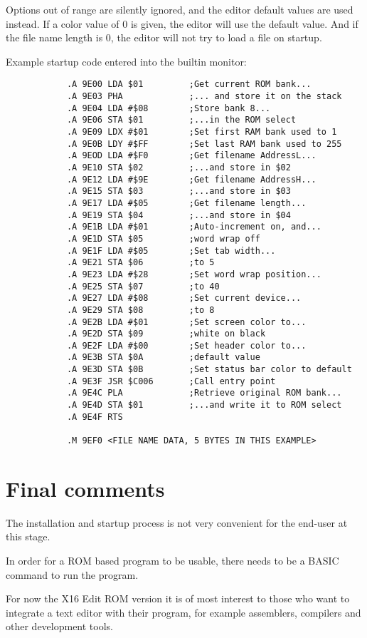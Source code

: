 \documentclass{article}
\begin{document}
        \vspace{1em}Options out of range are silently ignored, and the editor default values are used instead. If a color value of 0 is given, the
        editor will use the default value. And if the file name length is 0, the editor will not try to load a file on startup.

        Example startup code entered into the builtin monitor:

        \begin{verbatim}
            .A 9E00 LDA $01         ;Get current ROM bank...
            .A 9E03 PHA             ;... and store it on the stack
            .A 9E04 LDA #$08        ;Store bank 8...
            .A 9E06 STA $01         ;...in the ROM select
            .A 9E09 LDX #$01        ;Set first RAM bank used to 1
            .A 9E0B LDY #$FF        ;Set last RAM bank used to 255
            .A 9EOD LDA #$F0        ;Get filename AddressL...
            .A 9E10 STA $02         ;...and store in $02
            .A 9E12 LDA #$9E        ;Get filename AddressH...
            .A 9E15 STA $03         ;...and store in $03
            .A 9E17 LDA #$05        ;Get filename length...
            .A 9E19 STA $04         ;...and store in $04
            .A 9E1B LDA #$01        ;Auto-increment on, and...
            .A 9E1D STA $05         ;word wrap off
            .A 9E1F LDA #$05        ;Set tab width...
            .A 9E21 STA $06         ;to 5
            .A 9E23 LDA #$28        ;Set word wrap position...
            .A 9E25 STA $07         ;to 40
            .A 9E27 LDA #$08        ;Set current device...
            .A 9E29 STA $08         ;to 8
            .A 9E2B LDA #$01        ;Set screen color to...
            .A 9E2D STA $09         ;white on black
            .A 9E2F LDA #$00        ;Set header color to...
            .A 9E3B STA $0A         ;default value
            .A 9E3D STA $0B         ;Set status bar color to default
            .A 9E3F JSR $C006       ;Call entry point
            .A 9E4C PLA             ;Retrieve original ROM bank...
            .A 9E4D STA $01         ;...and write it to ROM select
            .A 9E4F RTS

            .M 9EF0 <FILE NAME DATA, 5 BYTES IN THIS EXAMPLE>
        \end{verbatim} 


\section{Final comments}

    The installation and startup process is not very convenient for the end-user at this stage. 
    
    In order for a ROM based program to be usable, there needs to be a BASIC command to run the program. 
    
    For now the X16 Edit ROM version it is of  most interest to those who want to integrate a text 
    editor with their program, for example assemblers, compilers and other development tools.
\end{document}
